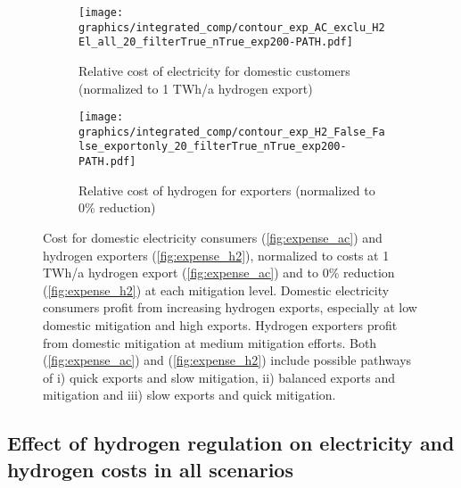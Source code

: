 \begin{figure*}[h!]
    \centering
    \begin{subfigure}[b]{0.49\linewidth}
        \centering
        \texttt{[image: graphics/integrated\_comp/contour\_exp\_AC\_exclu\_H2 El\_all\_20\_filterTrue\_nTrue\_exp200-PATH.pdf]}
        \caption{Relative cost of electricity for domestic customers (normalized to 1 TWh/a hydrogen export)}
        \label{fig:expense_ac_200}
    \end{subfigure}
    \hfill
    \begin{subfigure}[b]{0.49\linewidth}
        \centering
        \texttt{[image: graphics/integrated\_comp/contour\_exp\_H2\_False\_False\_exportonly\_20\_filterTrue\_nTrue\_exp200-PATH.pdf]}
        \caption{Relative cost of hydrogen for exporters (normalized to 0\% \co reduction)}
        \label{fig:expense_h2_200}
    \end{subfigure}
    \hfill
    \caption{  
    Cost for domestic electricity consumers (\ref{fig:expense_ac}) and hydrogen exporters (\ref{fig:expense_h2}),
    normalized to costs at 1 TWh/a hydrogen export (\ref{fig:expense_ac}) and
    to 0\% \co reduction (\ref{fig:expense_h2})
    at each mitigation level. Domestic electricity consumers profit from increasing hydrogen exports, especially at low domestic mitigation and high exports. Hydrogen exporters profit from domestic mitigation at medium mitigation efforts. Both (\ref{fig:expense_ac}) and (\ref{fig:expense_h2}) include possible pathways of i) quick exports and slow mitigation, ii) balanced exports and mitigation and iii) slow exports and quick mitigation.}
    \label{fig:expenses_default_200}
\end{figure*}


\subsection{Effect of hydrogen regulation on electricity and hydrogen costs in all scenarios} 


